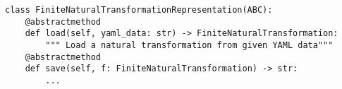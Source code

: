 \par\begin{minipage}{66ex}
\begin{verbatim}
class FiniteNaturalTransformationRepresentation(ABC):
    @abstractmethod
    def load(self, yaml_data: str) -> FiniteNaturalTransformation:
        """ Load a natural transformation from given YAML data"""
    @abstractmethod
    def save(self, f: FiniteNaturalTransformation) -> str:
        ...
\end{verbatim}
\end{minipage}\par